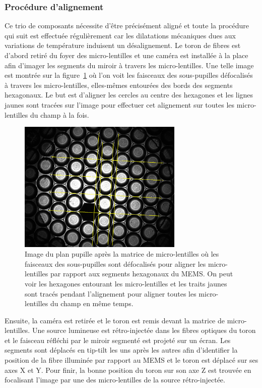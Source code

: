 \subsubsection{Procédure d'alignement}

Ce trio de composants nécessite d'être précisément aligné et toute la procédure qui suit est effectuée régulièrement car les dilatations mécaniques dues aux variations de température induisent un désalignement. Le toron de fibres est d'abord retiré du foyer des micro-lentilles et une caméra est installée à la place afin d'imager les segments du miroir à travers les micro-lentilles. Une telle image est montrée sur la figure~\ref{fig:MLAalignment} où l'on voit les faisceaux des sous-pupilles défocalisés à travers les micro-lentilles, elles-mêmes entourées des bords des segments hexagonaux. Le but est d'aligner les cercles au centre des hexagones et les lignes jaunes sont tracées sur l'image pour effectuer cet alignement sur toutes les micro-lentilles du champ à la fois.

\begin{figure}[ht!]
    \centering
    \includegraphics[width=0.7\textwidth]{Figure_Chap2/20191120_microlens_pupil_plane_2.jpg}
    \caption[Image du plan pupille après la matrice de micro-lentilles, prise lors de leur alignement par rapport au MEMS.]{Image du plan pupille après la matrice de micro-lentilles où les faisceaux des sous-pupilles sont défocalisés pour aligner les micro-lentilles par rapport aux segments hexagonaux du MEMS. On peut voir les hexagones entourant les micro-lentilles et les traits jaunes sont tracés pendant l'alignement pour aligner toutes les micro-lentilles du champ en même temps.}
    \label{fig:MLAalignment}
\end{figure}

Ensuite, la caméra est retirée et le toron est remis devant la matrice de micro-lentilles. Une source lumineuse est rétro-injectée dans les fibres optiques du toron et le faisceau réfléchi par le miroir segmenté est projeté sur un écran. Les segments sont déplacés en tip-tilt les uns après les autres afin d'identifier la position de la fibre illuminée par rapport au \ac{MEMS} et le toron est déplacé sur ses axes X et Y. Pour finir, la bonne position du toron sur son axe Z est trouvée en focalisant l'image par une des micro-lentilles de la source rétro-injectée.


